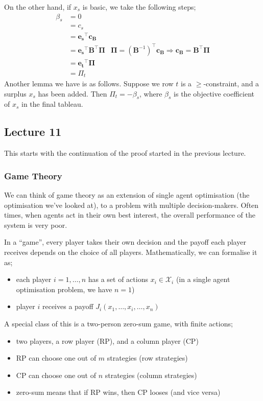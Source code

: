 \documentclass[a4paper, 12pt]{article}
\newcommand{\mat}[1]{\boldsymbol{#1}}
\renewcommand{\vec}[1]{\boldsymbol{#1}}
\begin{document}
                On the other hand, if $x_s$ is basic, we take the following steps;
                \begin{align*}
                    \beta_s & = 0 \\
                    & = c_s \\
                    & = \vec{e_s}^\top\vec{c_B} \\
                    & = \vec{e_s}^\top\mat{B}^\top\vec{\Pi} & \vec{\Pi} = \left(\mat{B}^{-1}\right)^\top\vec{c_B} \Rightarrow \vec{c_B} = \mat{B}^\top\vec{\Pi} \\
                    & = \vec{e_t}^\top\vec{\Pi} \\
                    & = \Pi_t
                \end{align*}
                Another lemma we have is as follows.
                Suppose we row $t$ is a $\geq$-constraint, and a surplus $x_s$ has been added.
                Then $\Pi_t = -\beta_s$, where $\beta_s$ is the objective coefficient of $x_s$ in the final tableau.
        \subsection*{Lecture 11}
            This starts with the continuation of the proof started in the previous lecture.
            \subsubsection*{Game Theory}
                We can think of game theory as an extension of single agent optimisation (the optimisation we've looked at), to a problem with multiple decision-makers.
                Often times, when agents act in their own best interest, the overall performance of the system is very poor.
                \medskip

                In a ``game'', every player takes their own decision and the payoff each player receives depends on the choice of all players.
                Mathematically, we can formalise it as;
                \begin{itemize}
                    \itemsep0em
                    \item each player $i = 1, \dots, n$ has a set of actions $x_i \in \mathcal{X}_i$ (in a single agent optimisation problem, we have $n = 1$)
                    \item player $i$ receives a payoff $J_i(x_1, \dots, x_i, \dots, x_n)$
                \end{itemize}
                A special class of this is a two-person zero-sum game, with finite actions;
                \begin{itemize}
                    \itemsep0em
                    \item two players, a row player (RP), and a column player (CP)
                    \item RP can choose one out of $m$ strategies (row strategies)
                    \item CP can choose one out of $n$ strategies (column strategies)
                    \item zero-sum means that if RP wins, then CP looses (and vice versa)
                \end{itemize}
\end{document}
